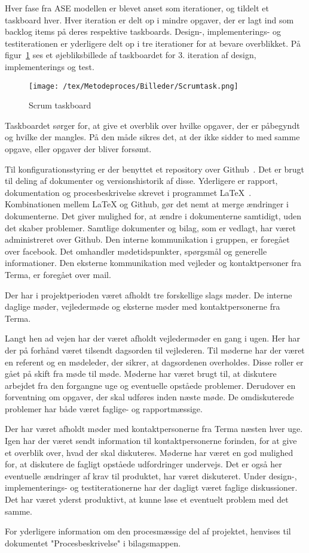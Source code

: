 Hver fase fra ASE modellen er blevet anset som iterationer, og tildelt et taskboard hver. Hver iteration er delt op i mindre opgaver, der er lagt ind som backlog items på deres respektive taskboards. Design-, implementerings- og testiterationen er yderligere delt op i tre iterationer for at bevare overblikket. På figur~\ref{fig:Taskboard} ses et øjebliksbillede af taskboardet for 3. iteration af design, implementerings og test.
\begin{figure}[H]
	\center
	\texttt{[image: /tex/Metodeproces/Billeder/Scrumtask.png]}
	\caption{Scrum taskboard}
	\label{fig:Taskboard}
\end{figure}        
\noindent Taskboardet sørger for, at give et overblik over hvilke opgaver, der er påbegyndt og hvilke der mangles. På den måde sikres det, at der ikke sidder to med samme opgave, eller opgaver der bliver forsømt.

Til konfigurationsstyring er der benyttet et repository over Github~\cite{Github}. Det er brugt til deling af dokumenter og versionshistorik af disse. Yderligere er rapport, dokumentation og procesbeskrivelse skrevet i programmet LaTeX~\cite{Latex}. Kombinationen mellem LaTeX og Github, gør det nemt at merge ændringer i dokumenterne. Det giver mulighed for, at ændre i dokumenterne samtidigt, uden det skaber problemer. Samtlige dokumenter og bilag, som er vedlagt, har været administreret over Github.
Den interne kommunikation i gruppen, er foregået over facebook. Det omhandler mødetidspunkter, spørgsmål og generelle informationer. Den eksterne kommunikation med vejleder og kontaktpersoner fra Terma, er foregået over mail.  

Der har i projektperioden været afholdt tre forskellige slags møder. De interne daglige møder, vejledermøde og eksterne møder med kontaktpersonerne fra Terma. 

Langt hen ad vejen har der været afholdt vejledermøder en gang i ugen. Her har der på forhånd været tilsendt dagsorden til vejlederen. Til møderne har der været en referent og en mødeleder, der sikrer, at dagsordenen overholdes. Disse roller er gået på skift fra møde til møde. Møderne har været brugt til, at diskutere arbejdet fra den forgangne uge og eventuelle opståede problemer. Derudover en forventning om opgaver, der skal udføres inden næste møde. De omdiskuterede problemer har både været faglige- og rapportmæssige. 

Der har været afholdt møder med kontaktpersonerne fra Terma næsten hver uge. Igen har der været sendt information til kontaktpersonerne forinden, for at give et overblik over, hvad der skal diskuteres. Møderne har været en god mulighed for, at diskutere de fagligt opståede udfordringer undervejs. Det er også her eventuelle ændringer af krav til produktet, har været diskuteret. Under design-, implementerings- og testiterationerne har der dagligt været faglige diskussioner. Det har været yderst produktivt, at kunne løse et eventuelt problem med det samme.

For yderligere information om den procesmæssige del af projektet, henvises til dokumentet "Procesbeskrivelse" i bilagsmappen.  